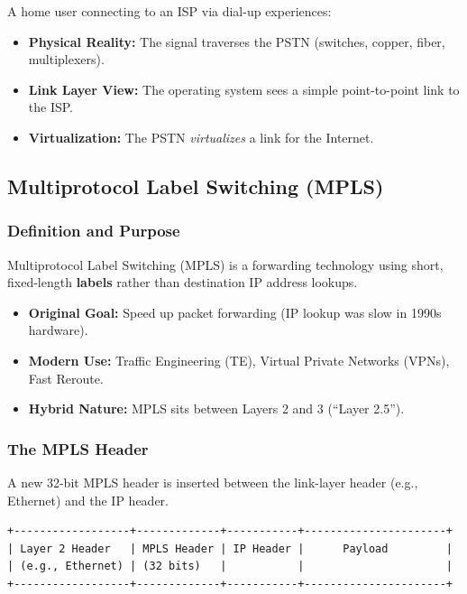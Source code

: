 \documentclass[12pt]{article}
\begin{document}
A home user connecting to an ISP via dial-up experiences:

\begin{itemize}
    \item \textbf{Physical Reality:} The signal traverses the PSTN (switches, copper, fiber, multiplexers).
    \item \textbf{Link Layer View:} The operating system sees a simple point-to-point link to the ISP.
    \item \textbf{Virtualization:} The PSTN \emph{virtualizes} a link for the Internet.
\end{itemize}

\subsection{Multiprotocol Label Switching (MPLS)}

\subsubsection{Definition and Purpose}

Multiprotocol Label Switching (MPLS) is a forwarding technology using short, fixed-length \textbf{labels} rather than destination IP address lookups.

\begin{itemize}
    \item \textbf{Original Goal:} Speed up packet forwarding (IP lookup was slow in 1990s hardware).
    \item \textbf{Modern Use:} Traffic Engineering (TE), Virtual Private Networks (VPNs), Fast Reroute.
    \item \textbf{Hybrid Nature:} MPLS sits between Layers 2 and 3 (``Layer 2.5'').
\end{itemize}

\subsubsection{The MPLS Header}

A new 32-bit MPLS header is inserted between the link-layer header (e.g., Ethernet) and the IP header.

\begin{verbatim}
+------------------+-------------+-----------+----------------------+
| Layer 2 Header   | MPLS Header | IP Header |      Payload         |
| (e.g., Ethernet) | (32 bits)   |           |                      |
+------------------+-------------+-----------+----------------------+
\end{verbatim}
\end{document}

